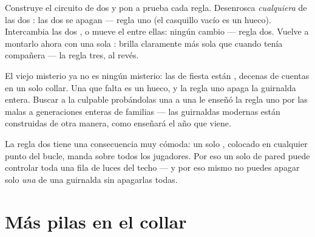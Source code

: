 \begin{example}\label{ex:g4:series-circuits:seeing}
Construye el circuito de dos  y pon a prueba cada regla.
Desenrosca \emph{cualquiera} de las dos : las dos se apagan
--- regla uno (el casquillo vacío es un hueco). Intercambia las dos
, o mueve el  entre ellas: ningún cambio ---
regla dos. Vuelve a montarlo ahora con una sola : brilla
claramente más sola que cuando tenía compañera --- la regla tres, al
revés.
\end{example}

\begin{example}\label{ex:g4:series-circuits:partylights}
El viejo misterio ya no es ningún misterio: las  de fiesta
están , decenas de cuentas en un solo collar. Una
 que falta es un hueco, y la regla uno apaga la guirnalda
entera. Buscar a la  culpable probándolas una a una le
enseñó la regla uno por las malas a generaciones enteras de familias
--- las guirnaldas modernas están construidas de otra manera, como
enseñará el año que viene.
\end{example}

\begin{remark}\label{rem:g4:series-circuits:switch}
La regla dos tiene una consecuencia muy cómoda: un solo
, colocado en cualquier punto del bucle, manda sobre
todos los jugadores. Por eso un solo  de pared puede
controlar toda una fila de luces del techo --- y por eso mismo no
puedes apagar solo \emph{una}  de una guirnalda  sin
apagarlas todas.
\end{remark}

\section{Más pilas en el collar}

